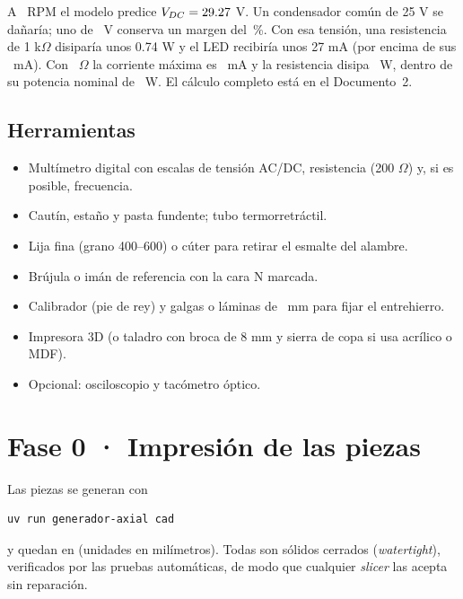 \documentclass[11pt]{article}
\begin{document}
\begin{nota}
A \ValRpmMaxima\ RPM el modelo predice $V_{DC}=29.27$ V. Un condensador común de 25 V se dañaría;
uno de \ValTensionNominalCondensador\ V conserva un margen del \ValMargenCondensador\,\%. Con esa tensión, una
resistencia de 1 k$\Omega$ disiparía unos 0.74 W y el LED recibiría unos 27 mA (por encima de sus
\ValCorrienteLedLimiteMili\ mA). Con \ValResistenciaLed\ $\Omega$ la corriente máxima es
\ValCorrienteLedMaxMili\ mA y la resistencia disipa \ValPotenciaResistenciaLedMax\ W, dentro de su potencia nominal
de \ValPotenciaNominalResistenciaLed\ W. El cálculo completo está en el Documento~2.
\end{nota}

\subsection{Herramientas}
\begin{itemize}
  \item Multímetro digital con escalas de tensión AC/DC, resistencia (200 $\Omega$) y, si es posible, frecuencia.
  \item Cautín, estaño y pasta fundente; tubo termorretráctil.
  \item Lija fina (grano 400–600) o cúter para retirar el esmalte del alambre.
  \item Brújula o imán de referencia con la cara N marcada.
  \item Calibrador (pie de rey) y galgas o láminas de \ValEntrehierro\ mm para fijar el entrehierro.
  \item Impresora 3D (o taladro con broca de 8 mm y sierra de copa si usa acrílico o MDF).
  \item Opcional: osciloscopio y tacómetro óptico.
\end{itemize}

\section{Fase 0 · Impresión de las piezas}
Las piezas se generan con
\begin{lstlisting}[style=consola]
uv run generador-axial cad
\end{lstlisting}
y quedan en  (unidades en milímetros). Todas son sólidos cerrados (\emph{watertight}),
verificados por las pruebas automáticas, de modo que cualquier \emph{slicer} las acepta sin reparación.
\end{document}
